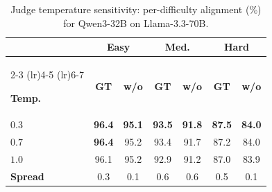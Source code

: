 \begin{table}[h]
\centering
\footnotesize
\setlength{\tabcolsep}{3pt}
\renewcommand{\arraystretch}{0.92}
\begin{tabular*}{\columnwidth}{@{\extracolsep{\fill}}lcccccc@{}}

\toprule

&
\multicolumn{2}{c}{\textbf{Easy}} &
\multicolumn{2}{c}{\textbf{Med.}} &
\multicolumn{2}{c}{\textbf{Hard}} \\

\cmidrule(lr){2-3}
\cmidrule(lr){4-5}
\cmidrule(lr){6-7}

\textbf{Temp.}
& \textbf{GT} & \textbf{w/o}
& \textbf{GT} & \textbf{w/o}
& \textbf{GT} & \textbf{w/o} \\

\midrule

$0.3$
& \textbf{96.4} & \textbf{95.1}
& \textbf{93.5} & \textbf{91.8}
& \textbf{87.5} & \textbf{84.0} \\

$0.7$
& \textbf{96.4} & 95.2
& 93.4 & 91.7
& 87.2 & 84.0 \\

$1.0$
& 96.1 & 95.2
& 92.9 & 91.2
& 87.0 & 83.9 \\

\midrule

\textbf{Spread}
& 0.3 & 0.1
& 0.6 & 0.6
& 0.5 & 0.1 \\

\bottomrule

\end{tabular*}
\caption{Judge temperature sensitivity: per-difficulty alignment (\%) for Qwen3-32B on Llama-3.3-70B.}
\label{tab:app-abl-temp}

\end{table}
